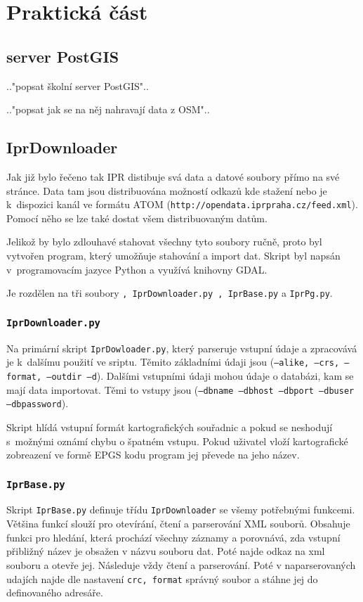 \chapter{Praktická část}
\label{3-Praktická část}

\section{server PostGIS}
\label{server PostGIS}
.."popsat školní server PostGIS"..

.."popsat jak se na něj nahravají data z OSM"..


\section{IprDownloader}
\label{Iprdownloader}
Jak již bylo řečeno tak IPR distibuje svá data a datové soubory přímo na své 
stránce. Data tam jsou distribuována možností odkazů kde stažení nebo je
k~dispozici kanál ve formátu ATOM ({\tt http://opendata.iprpraha.cz/feed.xml}). 
Pomocí něho se lze také dostat všem distribuovaným datům. 

Jelikož by bylo zdlouhavé stahovat všechny tyto soubory ručně, proto byl
vytvořen program, který umožňuje stahování a import dat. Skript byl napsán 
v~programovacím jazyce Python a využívá knihovny GDAL. 

Je rozdělen na tři soubory 
{\tt , IprDownloader.py , IprBase.py} a {\tt IprPg.py}.


\subsection{{\tt IprDownloader.py}}
Na primární skript {\tt IprDowloader.py}, který parseruje vstupní údaje a 
zpracovává je k~dalšímu použití ve sriptu. Těmito základními údaji jsou 
({\tt --alike, --crs, --format, --outdir --d}). Dalšími vstupními údaji mohou 
údaje o databázi, kam se mají data importovat. Těmi to vstupy jsou 
({\tt --dbname --dbhost --dbport --dbuser --dbpassword}).

Skript hlídá vstupní formát kartografických souřadnic a pokud se neshodují 
s~možnými oznámí chybu o špatném vstupu. Pokud uživatel vloží kartografické 
zobreazení ve formě EPGS kodu program jej převede na jeho název. 


\subsection{{\tt IprBase.py}}
Skript {\tt IprBase.py} definuje třídu {\tt IprDownloader} se všemy 
potřebnými funkcemi. Většina funkcí slouží pro otevírání, čtení a parserování
XML souborů. Obsahuje funkci pro hledání, která prochází všechny záznamy a 
porovnává, zda vstupní přibližný název je obsažen v názvu souboru dat. Poté 
najde odkaz na xml souboru a otevře jej. Následuje vždy čtení a parserování. 
Poté v naparserovaných udajích najde dle nastavení {\tt crc, format} správný soubor 
a stáhne jej do definovaného adresáře.


